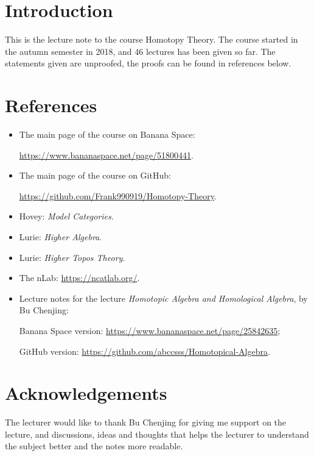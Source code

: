 \section*{Introduction}

This is the lecture note to the course Homotopy Theory. 
The course started in the autumn semester in 2018, and 46 lectures has been given so far.
The statements given are unproofed, the proofs can be found in references below.

\section*{References}

\begin{itemize}
\item The main page of the course on Banana Space: 

\url{https://www.bananaspace.net/page/51800441}.
\item The main page of the course on GitHub: 

\url{https://github.com/Frank990919/Homotopy-Theory}.
\item Hovey: \textit{Model Categories}.
\item Lurie: \textit{Higher Algebra}.
\item Lurie: \textit{Higher Topos Theory}.
\item The nLab: \url{https://ncatlab.org/}.
\item Lecture notes for the lecture \textit{Homotopic Algebra and Homological Algebra}, by Bu Chenjing:

Banana Space version: \url{https://www.bananaspace.net/page/25842635};

GitHub version: \url{https://github.com/abccsss/Homotopical-Algebra}.
\end{itemize}

\section*{Acknowledgements}

The lecturer would like to thank Bu Chenjing for giving me support on the lecture, and discussions, ideas and thoughts that helps the lecturer 
to understand the subject better and the notes more readable.